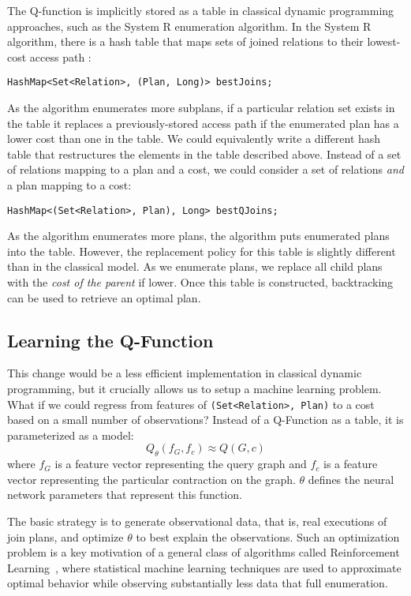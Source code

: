 The Q-function is implicitly stored as a table in classical dynamic programming approaches, such as the System R enumeration algorithm. In the System R algorithm, there is a hash table that maps sets of joined relations to their lowest-cost access path :
\begin{lstlisting}
HashMap<Set<Relation>, (Plan, Long)> bestJoins;
\end{lstlisting}
As the algorithm enumerates more subplans, if a particular relation set exists in the table it replaces a previously-stored access path if the enumerated plan has a lower cost than one in the table. We could equivalently write a different hash table that restructures the elements in the table described above. Instead of a set of relations mapping to a plan and a cost, we could consider a set of relations \emph{and} a plan mapping to a cost: 
\begin{lstlisting}
HashMap<(Set<Relation>, Plan), Long> bestQJoins;
\end{lstlisting}
As the algorithm enumerates more plans, the algorithm puts enumerated plans into the table. However, the replacement policy for this table is slightly different than in the classical model. As we enumerate plans, we replace all child plans  with the \emph{cost of the parent} if lower. Once this table is constructed, backtracking can be used to retrieve an optimal plan. 

\subsection{Learning the Q-Function}
This change  would be a less efficient implementation in classical dynamic programming, but it crucially allows us to setup a machine learning problem. 
What if we could regress from features of \texttt{(Set<Relation>, Plan)} to a cost based on a small number of observations?
Instead of a Q-Function as a table, it is parameterized as a model:
\[
Q_\theta(f_G,f_c) \approx Q(G,c)
\]
where $f_G$ is a feature vector representing the query graph and $f_c$ is a feature vector representing the particular contraction on the graph. $\theta$ defines the neural network  parameters that represent this function. 

The basic strategy  is to generate observational data, that is, real executions of join plans, and optimize $\theta$ to best explain the observations. Such an optimization problem is a key motivation of a general class of algorithms called Reinforcement Learning~\cite{sutton1998reinforcement}, where statistical machine learning techniques are used to approximate optimal behavior while observing substantially less data that full enumeration. 

